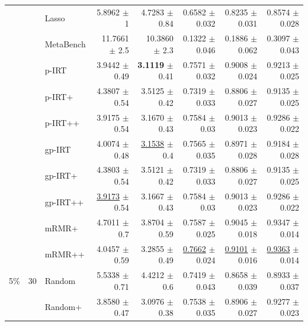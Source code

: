 \begin{longtable}{llp{}rrrrr}
 &  & Lasso & 5.8962 {\scriptsize $\pm$ 1} & 4.7283 {\scriptsize $\pm$ 0.84} & 0.6582 {\scriptsize $\pm$ 0.032} & 0.8235 {\scriptsize $\pm$ 0.031} & 0.8574 {\scriptsize $\pm$ 0.028} \\
 &  & MetaBench & 11.7661 {\scriptsize $\pm$ 2.5} & 10.3860 {\scriptsize $\pm$ 2.3} & 0.1322 {\scriptsize $\pm$ 0.046} & 0.1886 {\scriptsize $\pm$ 0.062} & 0.3097 {\scriptsize $\pm$ 0.043} \\
 &  & p-IRT & 3.9442 {\scriptsize $\pm$ 0.49} & \textbf{3.1119} {\scriptsize $\pm$ 0.41} & 0.7571 {\scriptsize $\pm$ 0.032} & 0.9008 {\scriptsize $\pm$ 0.024} & 0.9213 {\scriptsize $\pm$ 0.025} \\
 &  & p-IRT+ & 4.3807 {\scriptsize $\pm$ 0.54} & 3.5125 {\scriptsize $\pm$ 0.42} & 0.7319 {\scriptsize $\pm$ 0.033} & 0.8806 {\scriptsize $\pm$ 0.027} & 0.9135 {\scriptsize $\pm$ 0.025} \\
 &  & p-IRT++ & 3.9175 {\scriptsize $\pm$ 0.54} & 3.1670 {\scriptsize $\pm$ 0.43} & 0.7584 {\scriptsize $\pm$ 0.03} & 0.9013 {\scriptsize $\pm$ 0.023} & 0.9286 {\scriptsize $\pm$ 0.022} \\
 &  & gp-IRT & 4.0074 {\scriptsize $\pm$ 0.48} & \underline{3.1538} {\scriptsize $\pm$ 0.4} & 0.7565 {\scriptsize $\pm$ 0.035} & 0.8971 {\scriptsize $\pm$ 0.028} & 0.9184 {\scriptsize $\pm$ 0.028} \\
 &  & gp-IRT+ & 4.3803 {\scriptsize $\pm$ 0.54} & 3.5121 {\scriptsize $\pm$ 0.42} & 0.7319 {\scriptsize $\pm$ 0.033} & 0.8806 {\scriptsize $\pm$ 0.027} & 0.9135 {\scriptsize $\pm$ 0.025} \\
 &  & gp-IRT++ & \underline{3.9173} {\scriptsize $\pm$ 0.54} & 3.1667 {\scriptsize $\pm$ 0.43} & 0.7584 {\scriptsize $\pm$ 0.03} & 0.9013 {\scriptsize $\pm$ 0.023} & 0.9286 {\scriptsize $\pm$ 0.022} \\
 &  & mRMR+ & 4.7011 {\scriptsize $\pm$ 0.7} & 3.8704 {\scriptsize $\pm$ 0.59} & 0.7587 {\scriptsize $\pm$ 0.025} & 0.9045 {\scriptsize $\pm$ 0.018} & 0.9347 {\scriptsize $\pm$ 0.014} \\
 &  & mRMR++ & 4.0457 {\scriptsize $\pm$ 0.59} & 3.2855 {\scriptsize $\pm$ 0.49} & \underline{0.7662} {\scriptsize $\pm$ 0.024} & \underline{0.9101} {\scriptsize $\pm$ 0.016} & \underline{0.9363} {\scriptsize $\pm$ 0.014} \\
\midrule
5\% & 30 & Random & 5.5338 {\scriptsize $\pm$ 0.71} & 4.4212 {\scriptsize $\pm$ 0.6} & 0.7419 {\scriptsize $\pm$ 0.043} & 0.8658 {\scriptsize $\pm$ 0.039} & 0.8933 {\scriptsize $\pm$ 0.037} \\
 &  & Random+ & 3.8580 {\scriptsize $\pm$ 0.47} & 3.0976 {\scriptsize $\pm$ 0.38} & 0.7538 {\scriptsize $\pm$ 0.035} & 0.8906 {\scriptsize $\pm$ 0.027} & 0.9277 {\scriptsize $\pm$ 0.023} \\

\end{longtable}
